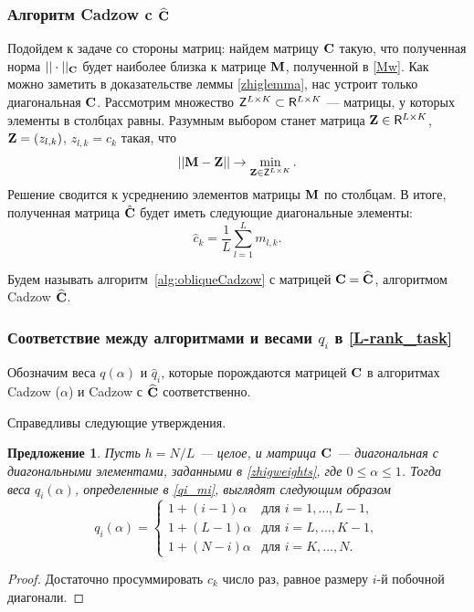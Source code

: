 \documentclass[12pt,a4paper,fleqn,leqno]{article}
\newtheorem{proposition}{Предложение}%
\begin{document}
\subsubsection{Алгоритм Cadzow c $\widehat{\mathbf{C}}$}
\label{sec:cadzow_hat}
Подойдем к задаче со стороны матриц: найдем матрицу $\mathbf{C}$ такую, что полученная норма $||\cdot||_{\mathbf{C}}$ будет наиболее близка к матрице $\mathbf{M}$, полученной в \eqref{Mw}. Как можно заметить в доказательстве леммы \ref{zhiglemma}, нас устроит только диагональная $\mathbf{C}$. Рассмотрим множество $\mathsf{Z}^{L \times K} \subset \mathsf{R}^{L \times K}$ --- матрицы, у которых элементы в столбцах равны. Разумным выбором станет матрица $\mathbf{Z} \in \mathsf{R}^{L \times K}$, $\mathbf{Z}=(z_{l,k})$, $z_{l,k} = c_k$ такая, что
\begin{equation*}
||\mathbf{M} - \mathbf{Z}|| \to \min_{\mathbf{Z} \in \mathsf{Z}^{L \times K}}.
\end{equation*}
Решение сводится к усреднению элементов матрицы $\mathbf{M}$ по столбцам. В итоге, полученная матрица $\hat {\mathbf{C}}$ будет иметь следующие диагональные элементы:
\begin{equation}\label{my_s}
\hat c_k = \frac{1}{L}\sum_{l=1}^L m_{l, k}.
\end{equation}

Будем называть алгоритм~\ref{alg:obliqueCadzow} с матрицей $\mathbf{C}=\widehat{\mathbf{C}}$, алгоритмом Cadzow $\widehat{\mathbf{C}}$.

\subsubsection{Соответствие между алгоритмами и весами $q_i$ в \eqref{L-rank_task}}

Обозначим веса $q(\alpha)$ и $\hat q_i$, которые порождаются матрицей $\mathbf{C}$ в алгоритмах Cadzow ($\alpha$) и Cadzow с $\widehat{\mathbf{C}}$ соответственно.

Справедливы следующие утверждения. 

\begin{proposition}\label{zhigconseq}
Пусть $h = N/L$ --- целое, и матрица $\mathbf{C}$ --- диагональная с диагональными элементами,
заданными в \eqref{zhigweights},
где $0 \le \alpha \le 1$. Тогда веса $q_i(\alpha)$, определенные в \eqref{qi_mi}, выглядят следующим образом
\begin{equation*}
q_i (\alpha) = \begin{cases}
1 + (i - 1) \alpha & \text{для $i = 1, \ldots, L-1,$}\\
1 + (L - 1) \alpha & \text{для $i = L, \ldots, K-1,$}\\
1 + (N - i) \alpha & \text{для $i = K, \ldots, N.$}
\end{cases}
\end{equation*}
\end{proposition}
\begin{proof}
Достаточно просуммировать $c_k$ число раз, равное размеру $i$-й побочной диагонали.
\end{proof}
\end{document}
